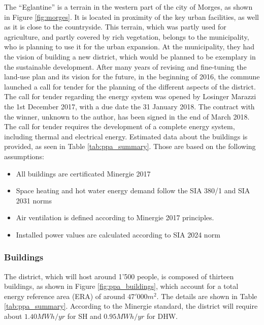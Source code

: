 \documentclass{article}
\begin{document}
The “Eglantine” is a terrain in the western part of the city of Morges, as shown in Figure \ref{fig:morges}. It is located in proximity of the key urban facilities, as well as it is close to the countryside. This terrain, which was partly used for agriculture, and partly covered by rich vegetation, belongs to the municipality, who is planning to use it for the urban expansion. At the municipality, they had the vision of building a new district, which would be planned to be exemplary in the sustainable development. After many years of revising and fine-tuning the land-use plan and its vision for the future, in the beginning of 2016, the commune launched a call for tender for the planning of the different aspects of the district. The call for tender regarding the energy system was opened by Losinger Marazzi the 1st December 2017, with a due date the 31 January 2018. The contract with the winner, unknown to the author, has been signed in the end of March 2018. \\

The call for tender requires the development of a complete energy system, including thermal and electrical energy. Estimated data about the buildings is provided, as seen in Table \ref{tab:ppa_summary}. Those are based on the following assumptions:
\begin{itemize}
    \item All buildings are certificated Minergie 2017
    \item Space heating and hot water energy demand follow the SIA 380/1 and SIA 2031 norms
    \item Air ventilation is defined according to Minergie 2017 principles.
    \item Installed power values are calculated according to SIA 2024 norm
\end{itemize}

\subsubsection{Buildings}
The district, which will host around 1'500 people, is composed of thirteen buildings, as shown in Figure \ref{fig:ppa_buildings}, which account for a total energy reference area (ERA) of around $47'000 m^{2}$. The details are shown in Table \ref{tab:ppa_summary}. According to the Minergie standard, the district will require about $1.40 MWh/yr$ for SH and $0.95 MWh/yr$ for DHW.\\


\end{document}
